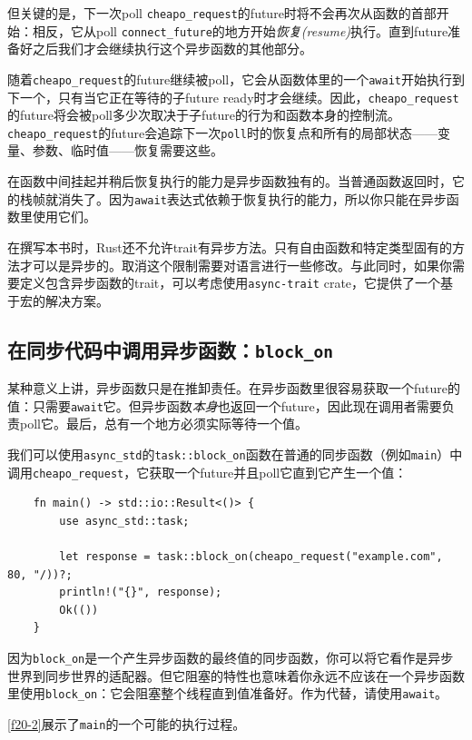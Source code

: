 但关键的是，下一次poll \texttt{cheapo\_request}的future时将不会再次从函数的首部开始：相反，它从poll \texttt{connect\_future}的地方开始\emph{恢复(resume)}执行。直到future准备好之后我们才会继续执行这个异步函数的其他部分。

随着\texttt{cheapo\_request}的future继续被poll，它会从函数体里的一个\texttt{await}开始执行到下一个，只有当它正在等待的子future ready时才会继续。因此，\texttt{cheapo\_request}的future将会被poll多少次取决于子future的行为和函数本身的控制流。\texttt{cheapo\_request}的future会追踪下一次\texttt{poll}时的恢复点和所有的局部状态——变量、参数、临时值——恢复需要这些。

在函数中间挂起并稍后恢复执行的能力是异步函数独有的。当普通函数返回时，它的栈帧就消失了。因为\texttt{await}表达式依赖于恢复执行的能力，所以你只能在异步函数里使用它们。

在撰写本书时，Rust还不允许trait有异步方法。只有自由函数和特定类型固有的方法才可以是异步的。取消这个限制需要对语言进行一些修改。与此同时，如果你需要定义包含异步函数的trait，可以考虑使用\texttt{async-trait} crate，它提供了一个基于宏的解决方案。

\subsection{在同步代码中调用异步函数：\texttt{block\_on}}
某种意义上讲，异步函数只是在推卸责任。在异步函数里很容易获取一个future的值：只需要\texttt{await}它。但异步函数\emph{本身}也返回一个future，因此现在调用者需要负责poll它。最后，总有一个地方必须实际等待一个值。

我们可以使用\texttt{async\_std}的\texttt{task::block\_on}函数在普通的同步函数（例如\texttt{main}）中调用\texttt{cheapo\_request}，它获取一个future并且poll它直到它产生一个值：
\begin{verbatim}
    fn main() -> std::io::Result<()> {
        use async_std::task;

        let response = task::block_on(cheapo_request("example.com", 80, "/))?;
        println!("{}", response);
        Ok(())
    }
\end{verbatim}

因为\texttt{block\_on}是一个产生异步函数的最终值的同步函数，你可以将它看作是异步世界到同步世界的适配器。但它阻塞的特性也意味着你永远不应该在一个异步函数里使用\texttt{block\_on}：它会阻塞整个线程直到值准备好。作为代替，请使用\texttt{await}。

\autoref{f20-2}展示了\texttt{main}的一个可能的执行过程。

